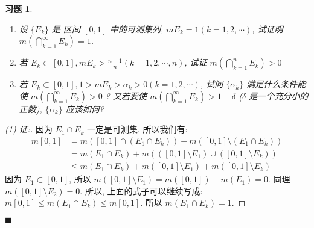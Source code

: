 \documentclass{article}
\newtheorem{exercise}{习题}
\newenvironment{solve}{{\flushleft\textit{解.}}}{\hfill $\blacksquare$}
\begin{document}
\begin{exercise}
  \begin{enumerate}
  \item 设 $\{E_k\}$ 是 区间 $[0, 1]$ 中的可测集列, $mE_k = 1 (k = 1, 2, \cdots)$, 试证明 $m(\bigcap_{k=1}^\infty E_k) = 1$.
  \item 若 $E_k \subset [0, 1], mE_k > \frac{n-1}{n} (k = 1, 2, \cdots, n)$, 试证 $m(\bigcap_{k=1}^n E_k) > 0$
  \item 若 $E_k \subset [0, 1], 1 > mE_k > \alpha_k > 0 (k = 1, 2, \cdots)$, 试问 $\{\alpha_k\}$ 满足什么条件能使 $m(\bigcap_{k=1}^\infty E_k) > 0$ ? 又若要使 $m(\bigcap_{k=1}^\infty E_k) > 1 - \delta$ ($\delta$ 是一个充分小的正数), $\{\alpha_k\}$ 应该如何?
  \end{enumerate}
\end{exercise}
\begin{solve}
  \begin{proof}[(1) 证:]
  因为 $E_1 \cap E_k$ 一定是可测集, 所以我们有:
  \begin{align*}
    m[0, 1] &= m([0,1] \cap (E_1\cap E_k)) + m([0, 1] \setminus (E_1\cap E_k)) \\
            &= m(E_1\cap E_k) + m(([0,1] \setminus E_1) \cup ([0, 1] \setminus E_k)) \\
    &\leq m(E_1\cap E_k) + m([0, 1] \setminus E_1) + m([0, 1] \setminus E_k)
  \end{align*}
  因为 $E_1 \subset [0, 1]$, 所以 $m([0, 1]\setminus E_1) = m([0, 1]) - m(E_1) = 0$. 同理 $m([0, 1]\setminus E_2) = 0$. 所以, 上面的式子可以继续写成: $m[0, 1] \leq m(E_1 \cap E_k) \leq m[0, 1]$. 所以 $m(E_1\cap E_k) = 1$.


\end{proof}
\end{solve}
\end{document}
